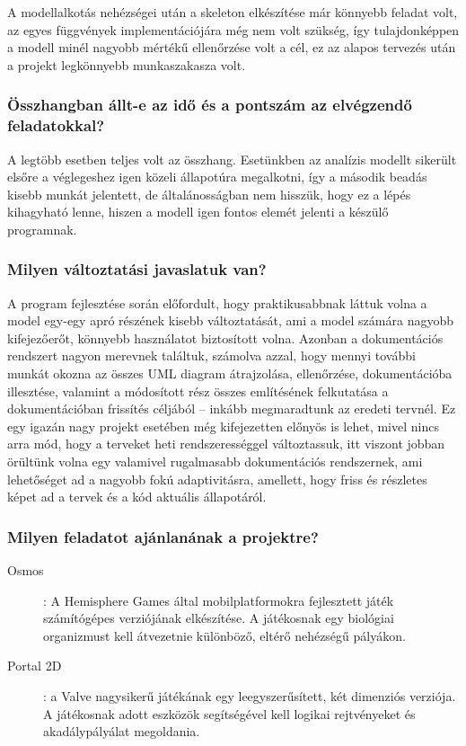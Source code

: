 A modellalkotás nehézségei után a skeleton elkészítése már könnyebb feladat volt, az egyes függvények implementációjára még nem volt szükség, így tulajdonképpen a modell minél nagyobb mértékű ellenőrzése volt a cél, ez az alapos tervezés után a projekt legkönnyebb munkaszakasza volt.
		
		\subsubsection*{Összhangban állt-e az idő és a pontszám az elvégzendő feladatokkal?}
A legtöbb esetben teljes volt az összhang. Esetünkben az analízis modellt sikerült elsőre a véglegeshez igen közeli állapotúra megalkotni, így a második beadás kisebb munkát jelentett, de általánosságban nem hisszük, hogy ez a lépés kihagyható lenne, hiszen a modell igen fontos elemét jelenti a készülő programnak.
		
		\subsubsection*{Milyen változtatási javaslatuk van?}
		A program fejlesztése során előfordult, hogy praktikusabbnak láttuk volna a model egy-egy apró részének kisebb változtatását, ami a model számára nagyobb kifejezőerőt, könnyebb használatot biztosított volna. Azonban a dokumentációs rendszert nagyon merevnek találtuk, számolva azzal, hogy mennyi további munkát okozna az összes UML diagram átrajzolása, ellenőrzése, dokumentációba illesztése, valamint a módosított rész összes említésének felkutatása a dokumentációban frissítés céljából -- inkább megmaradtunk az eredeti tervnél. Ez egy igazán nagy projekt esetében még kifejezetten előnyös is lehet, mivel nincs arra mód, hogy a terveket heti rendszerességgel változtassuk, itt viszont jobban örültünk volna egy valamivel rugalmasabb dokumentációs rendszernek, ami lehetőséget ad a nagyobb fokú adaptivitásra, amellett, hogy friss és részletes képet ad a tervek és a kód aktuális állapotáról.
		
		\subsubsection*{Milyen feladatot ajánlanának a projektre?}
		\begin{description}
\item[Osmos]: A Hemisphere Games által mobilplatformokra fejlesztett játék számítógépes verziójának elkészítése. A játékosnak egy biológiai organizmust kell átvezetnie különböző, eltérő nehézségű pályákon.

\item[Portal 2D]: a Valve nagysikerű játékának egy leegyszerűsített, két dimenziós verziója. A játékosnak adott eszközök segítségével kell logikai rejtvényeket és akadálypályálat megoldania.		
        \end{description}
